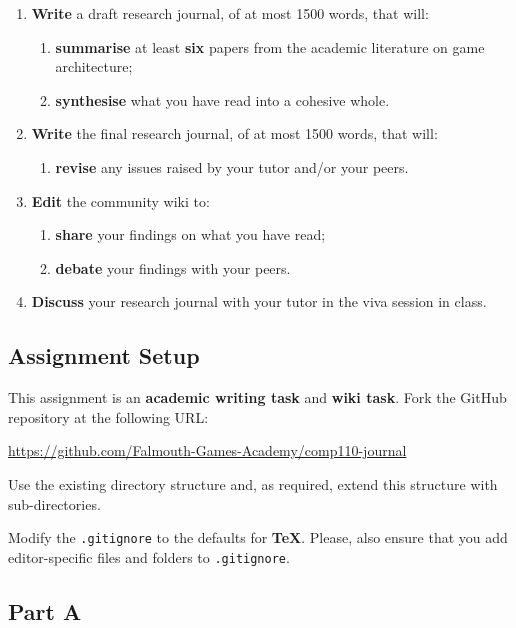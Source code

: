 \documentclass{../fal_assignment}
\begin{document}
\begin{enumerate}[label=(\Alph*)]
    \item \textbf{Write} a draft research journal, of at most 1500 words, that will:
    	\begin{enumerate}[label=(\roman*)]
    		\item \textbf{summarise} at least \textbf{six} papers from the academic literature on game architecture;
    		\item \textbf{synthesise} what you have read into a cohesive whole.
    	\end{enumerate}
    \item \textbf{Write} the final research journal, of at most 1500 words, that will:
    	\begin{enumerate}[label=(\roman*)]
    		\item \textbf{revise} any issues raised by your tutor and/or your peers.
    	\end{enumerate}
    \item \textbf{Edit} the community wiki to:
    	\begin{enumerate}[label=(\roman*)]
    		\item \textbf{share} your findings on what you have read;
    		\item \textbf{debate} your findings with your peers.
    	\end{enumerate}
    \item \textbf{Discuss} your research journal with your tutor in the viva session in class.
\end{enumerate}

\subsection*{Assignment Setup}

This assignment is an \textbf{academic writing task} and \textbf{wiki task}. Fork the GitHub repository at the following URL:

\indent \url{https://github.com/Falmouth-Games-Academy/comp110-journal}

Use the existing directory structure and, as required, extend this structure with sub-directories.

Modify the \texttt{.gitignore} to the defaults for \textbf{TeX}. Please, also ensure that you add editor-specific files and folders to \texttt{.gitignore}. 

\subsection*{Part A}
\end{document}
